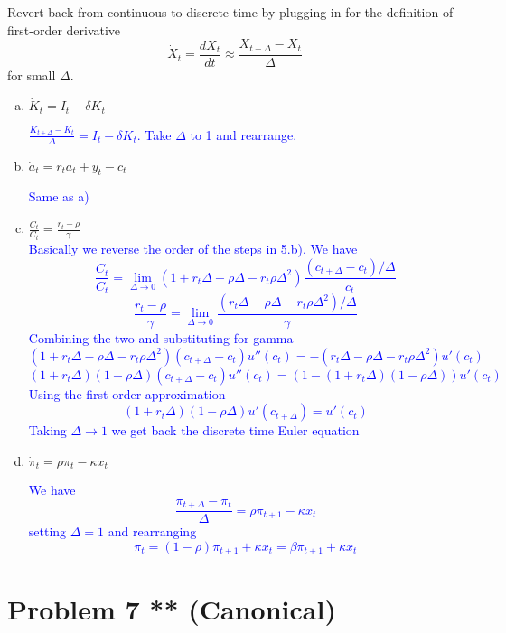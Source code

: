\documentclass[11pt]{extarticle}
\theoremstyle{plain}
\theoremstyle{definition}
\begin{document}
Revert back from continuous to discrete time by plugging in for the definition of first-order derivative
\begin{equation*}
	\dot X_t = \frac{dX_t}{dt} \approx \frac{X_{t+\Delta} - X_t}{\Delta}
\end{equation*}
for small $\Delta$. 

\begin{enumerate}[(a)]
\item $\dot K_t = I_t - \delta K_t$

\textcolor{blue}{$\frac{K_{t+\Delta}-K_t}{\Delta}=I_t-\delta K_t$. Take $\Delta$ to 1 and rearrange.}


\item $\dot a_t = r_t a_t + y_t - c_t$

\textcolor{blue}{Same as a)}

\item $\frac{\dot C_t}{C_t} = \frac{r_t - \rho}{\gamma}$ \\

\textcolor{blue}{Basically we reverse the order of the steps in 5.b). We have $$ \frac{\dot C_t}{C_t} = \lim_{\Delta \rightarrow 0} (1+r_t \Delta-\rho \Delta - r_t \rho \Delta^2) \frac{(c_{t+\Delta}-c_t)/\Delta}{c_t} $$ $$ \frac{r_t - \rho}{\gamma}  =  \lim_{\Delta \rightarrow 0}  \frac{(r_t \Delta-\rho \Delta - r_t \rho \Delta^2)/\Delta}{\gamma} $$ Combining the two and substituting for gamma $$ (1+r_t \Delta-\rho \Delta - r_t \rho \Delta^2) (c_{t+\Delta}-c_t)u''(c_{t}) = - (r_t \Delta-\rho \Delta - r_t \rho \Delta^2) u'(c_t)$$ $$(1+r_t \Delta)(1-\rho \Delta) (c_{t+\Delta}-c_t)u''(c_{t})=(1-(1+r_t \Delta)(1-\rho \Delta))u'(c_t) $$ Using the first order approximation $$(1+r_t \Delta)(1-\rho \Delta) u'(c_{t+\Delta})=u'(c_t)$$ Taking $\Delta \rightarrow 1$ we get back the discrete time Euler equation}

\item $\dot \pi_t = \rho \pi_t - \kappa x_t$

\textcolor{blue}{We have $$\frac{\pi_{t+\Delta}-\pi_t}{\Delta}=\rho \pi_{t+1}-\kappa x_t$$ setting $\Delta = 1$ and rearranging $$\pi_t = (1-\rho)\pi_{t+1}+\kappa x_t = \beta \pi_{t+1}+\kappa x_t$$}
\end{enumerate}



\vspace{10mm}
\section*{Problem 7 ** (Canonical)}
\end{document}
